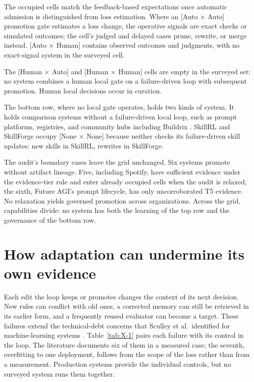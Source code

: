 The occupied cells match the feedback-based expectations once automatic admission is distinguished from loss estimation. Where an {[}Auto × Auto{]} promotion gate estimates a loss change, the operative signals are exact checks or simulated outcomes; the cell's judged and delayed cases prune, rewrite, or merge instead. {[}Auto × Human{]} contains observed outcomes and judgments, with no exact-signal system in the surveyed cell.

The {[}Human × Auto{]} and {[}Human × Human{]} cells are empty in the surveyed set: no system combines a human local gate on a failure-driven loop with subsequent promotion. Human local decisions occur in curation.

The bottom row, where no local gate operates, holds two kinds of system. It holds comparison systems without a failure-driven local loop, such as prompt platforms, registries, and community hubs including Buildrix \cite{jiang2026buildrix}. SkillRL and SkillForge occupy {[}None × None{]} because neither checks its failure-driven skill updates: new skills in SkillRL, rewrites in SkillForge.

The audit's boundary cases leave the grid unchanged. Six systems promote without artifact lineage. Five, including Spotify, have sufficient evidence under the evidence-tier rule and enter already occupied cells when the audit is relaxed; the sixth, Future AGI's prompt lifecycle, has only uncorroborated T5 evidence. No relaxation yields governed promotion across organizations. Across the grid, capabilities divide: no system has both the learning of the top row and the governance of the bottom row.

\section{How adaptation can undermine its own evidence}\label{sec:failure}

Each edit the loop keeps or promotes changes the context of its next decision. New rules can conflict with old ones, a corrected memory can still be retrieved in its earlier form, and a frequently reused evaluator can become a target. These failures extend the technical-debt concerns that Sculley et al.~identified for machine-learning systems \cite{sculley2015debt}. Table~\ref{tab:X-1} pairs each failure with its control in the loop. The literature documents six of them in a measured case; the seventh, overfitting to one deployment, follows from the scope of the loss rather than from a measurement. Production systems provide the individual controls, but no surveyed system runs them together.

